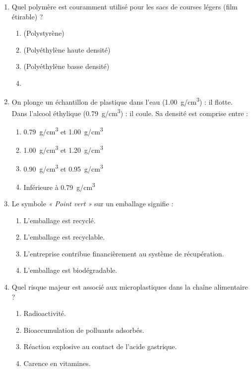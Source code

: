 \documentclass[11pt]{article}
\begin{document}
\begin{exercice}
\begin{enumerate}
    \item Quel polymère est couramment utilisé pour les sacs de courses légers (film étirable) ?
    \begin{enumerate}
        \item {} (Polystyrène)
        \item {} (Polyéthylène haute densité)
        \item {} (Polyéthylène basse densité)
        \item {}
    \end{enumerate}
    \item On plonge un échantillon de plastique dans l'eau (\SI{1,00}{g/cm^3}) : il flotte. Dans l'alcool éthylique (\SI{0,79}{g/cm^3}) : il coule. Sa densité est comprise entre :
    \begin{enumerate}
        \item \SI{0,79}{g/cm^3} et \SI{1,00}{g/cm^3}
        \item \SI{1,00}{g/cm^3} et \SI{1,20}{g/cm^3}
        \item \SI{0,90}{g/cm^3} et \SI{0,95}{g/cm^3}
        \item Inférieure à \SI{0,79}{g/cm^3}
    \end{enumerate}
    \item Le symbole \textit{« Point vert »} sur un emballage signifie :
    \begin{enumerate}
        \item L'emballage est recyclé.
        \item L'emballage est recyclable.
        \item L'entreprise contribue financièrement au système de récupération.
        \item L'emballage est biodégradable.
    \end{enumerate}
    \item Quel risque majeur est associé aux microplastiques dans la chaîne alimentaire ?
    \begin{enumerate}
        \item Radioactivité.
        \item Bioaccumulation de polluants adsorbés.
        \item Réaction explosive au contact de l'acide gastrique.
        \item Carence en vitamines.
    \end{enumerate}
\end{enumerate}
\end{exercice}
\end{document}
